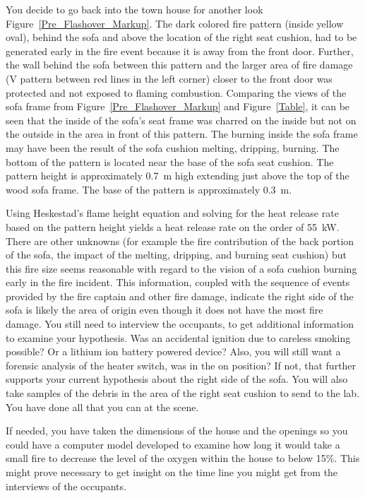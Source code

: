 \documentclass[twoside]{uocthesis}
\begin{document}
{You decide to go back into the town house for another look Figure~\ref{Pre_Flashover_Markup}.  The dark colored fire pattern (inside yellow oval), behind the sofa and above the location of the right seat cushion, had to be generated early in the fire event because it is away from the front door. Further, the wall behind the sofa between this pattern and the larger area of fire damage (V pattern between red lines in the left corner) closer to the front door was protected and not exposed to flaming combustion.  Comparing the views of the sofa frame from Figure~\ref{Pre_Flashover_Markup} and Figure~\ref{Table}, it can be seen that the inside of the sofa's seat frame was charred on the inside but not on the outside in the area in front of this pattern.  The burning inside the sofa frame may have been the result of the sofa cushion melting, dripping, burning.  The bottom of the pattern is located near the base of the sofa seat cushion.  The pattern height is approximately 0.7~m high extending just above the top of the wood sofa frame.  The base of the pattern is approximately 0.3~m.  

Using Heskestad's flame height equation and solving for the heat release rate based on the pattern height yields a heat release rate on the order of 55~kW. There are other unknowns (for example the fire contribution of the back portion of the sofa, the impact of the melting, dripping, and burning seat cushion) but this fire size seems reasonable with regard to the vision of a sofa cushion burning early in the fire incident. This information, coupled with the sequence of events provided by the fire captain and other fire damage, indicate the right side of the sofa is likely the area of origin even though it does not have the most fire damage.  You still need to interview the occupants, to get additional information to examine your hypothesis.  Was an accidental ignition due to careless smoking possible? Or a lithium ion battery powered device?  Also, you will still want a forensic analysis of the heater switch, was in the on position?  If not, that further supports your current hypothesis about the right side of the sofa.  You will also take samples of the debris in the area of the right seat cushion to send to the lab.  You have done all that you can at the scene.  

If needed, you have taken the dimensions of the house and the openings so you could have a computer model developed to examine how long it would take a small fire to decrease the level of the oxygen within the house to below 15\%.  This might prove necessary to get insight on the time line you might get from the interviews of the occupants. 

}
\end{document}

